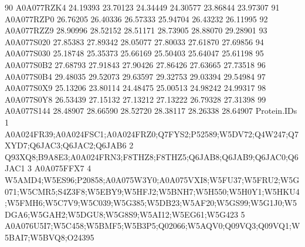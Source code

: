 \documentclass{beamer}
\begin{document}
\begin{frame}[fragile]
\begin{itemize}
\begin{Schunk}
\begin{Soutput}
90   A0A077RZK4 24.19393 23.70123 24.34449  24.30577  23.86844  23.97307
91   A0A077RZP0 26.76205 26.40336 26.57333  25.94704  26.43232  26.11995
92   A0A077RZZ9 28.90996 28.52152 28.51171  28.73905  28.88070  29.28901
93   A0A077S020 27.85383 27.89342 28.05077  27.80033  27.61870  27.69856
94   A0A077S030 25.18748 25.35373 25.66169  25.50403  25.64047  25.61198
95   A0A077S0B2 27.68793 27.91843 27.90426  27.86426  27.63665  27.73518
96   A0A077S0B4 29.48035 29.52073 29.63597  29.32753  29.03394  29.54984
97   A0A077S0X9 25.13206 23.80114 24.48475  25.00513  24.98242  24.99317
98   A0A077S0Y8 26.53439 27.15132 27.13212  27.13222  26.79328  27.31398
99   A0A077S144 28.48907 28.66590 28.52720  28.38117  28.26338  28.64907
                                                                                                                                                                                                                                                                                                                                                                      Protein.IDs
1                                                                                                                                                                                                                                                                                        A0A024FR39;A0A024FSC1;A0A024FRZ0;Q7FYS2;P52589;W5DV72;Q4W247;Q7XYD7;Q6JAC3;Q6JAC2;Q6JAB6
2                                                                                                                                                                                                                                                                                                              Q93XQ8;B9A8E3;A0A024FRN3;F8THZ8;F8THZ5;Q6JAB8;Q6JAB9;Q6JAC0;Q6JAC1
3                                                                                                                                                                                                                                                                                                                                                                      A0A075FFX7
4                                                                                                                                                W5AMD4;W5ES96;P20858;A0A075W3Y0;A0A075VXI8;W5FU37;W5FRU2;W5G071;W5CMR5;S4Z3F8;W5EBY9;W5HFJ2;W5BNH7;W5H550;W5H0Y1;W5HKU4;W5FMH6;W5C7V9;W5C039;W5G385;W5DB23;W5AF20;W5GS99;W5G1J0;W5DGA6;W5GAH2;W5DGU8;W5G8S9;W5AI12;W5EG61;W5G423
5                                                                                                                                                                                                                                                                                                A0A076U5I7;W5C458;W5BMF5;W5B3P5;Q02066;W5AQV0;Q09VQ3;Q09VQ1;W5BAI7;W5BVQ8;O24395

\end{Soutput}
\end{Schunk}
\end{itemize}
\end{frame}
\end{document}
